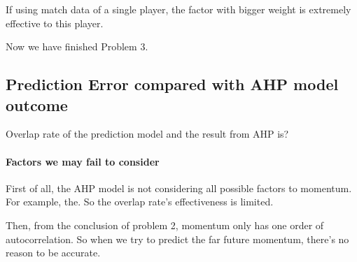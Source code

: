 If using match data of a single player, the factor with bigger weight is extremely effective to 
this player.

Now we have finished Problem 3.

\subsection{Prediction Error compared with AHP model outcome}

Overlap rate of the prediction model and the result from AHP is?

\paragraph{Factors we may fail to consider}

First of all, the AHP model is not considering all possible factors to momentum.
For example, the.
So the overlap rate's effectiveness is limited.

Then, from the conclusion of problem 2, momentum only has one order of autocorrelation.
So when we try to predict the far future momentum, there's no reason to be accurate.